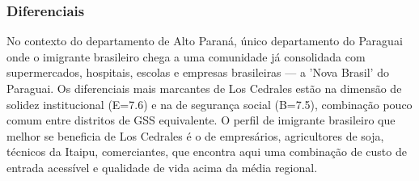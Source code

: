 \subsubsection*{Diferenciais}\label{dif-los-cedrales-1010}
No contexto do departamento de Alto Paraná, único departamento do Paraguai onde o imigrante brasileiro chega a uma comunidade já consolidada com supermercados, hospitais, escolas e empresas brasileiras — a 'Nova Brasil' do Paraguai. Os diferenciais mais marcantes de Los Cedrales estão na dimensão de solidez institucional (E=7.6) e na de segurança social (B=7.5), combinação pouco comum entre distritos de GSS equivalente. O perfil de imigrante brasileiro que melhor se beneficia de Los Cedrales é o de empresários, agricultores de soja, técnicos da Itaipu, comerciantes, que encontra aqui uma combinação de custo de entrada acessível e qualidade de vida acima da média regional.
